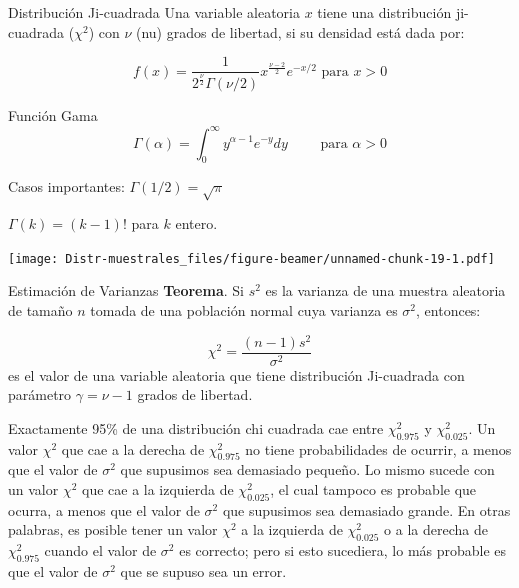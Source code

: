 \documentclass[
  10pt,
  ignorenonframetext,
]{beamer}
\begin{document}
\begin{frame}{}
\protect\hypertarget{section-46}{}
\begin{block}{Distribución Ji-cuadrada}
\protect\hypertarget{distribuciuxf3n-ji-cuadrada}{}
Una variable aleatoria \(x\) tiene una distribución ji-cuadrada
(\(\chi^2\)) con \(\nu\) (nu) grados de libertad, si su densidad está
dada por:

\[f(x)=\frac{1}{2^{\frac{\nu}{2}}\Gamma(\nu/2)}x^{\frac{\nu-2}{2}}e^{-x/2} \mbox{ para } x>0\]
\end{block}

\begin{block}{Función Gama}
\protect\hypertarget{funciuxf3n-gama}{}
\[\Gamma(\alpha)=\int_0^\infty y^{\alpha -1}e^{-y}dy \qquad \mbox{ para } \alpha >0\]

Casos importantes: \(\Gamma(1/2)=\sqrt{\pi}\)

\(\Gamma(k)= (k-1)!\) para \(k\) entero.
\end{block}
\end{frame}

\begin{frame}{}
\protect\hypertarget{section-47}{}
\texttt{[image: Distr-muestrales\_files/figure-beamer/unnamed-chunk-19-1.pdf]}
\end{frame}

\begin{frame}{}
\protect\hypertarget{section-48}{}
\begin{block}{Estimación de Varianzas}
\protect\hypertarget{estimaciuxf3n-de-varianzas}{}
\textbf{Teorema}. Si \(s^2\) es la varianza de una muestra aleatoria de
tamaño \(n\) tomada de una población normal cuya varianza es
\(\sigma^2\), entonces:

\[\chi^2=\frac{(n-1)s^2}{\sigma^2}\] es el valor de una variable
aleatoria que tiene distribución Ji-cuadrada con parámetro
\(\gamma = \nu - 1\) grados de libertad.

\bigskip

Exactamente 95\% de una distribución chi cuadrada cae entre
\(\chi_{0.975}^2\) y \(\chi_{0.025}^2\). Un valor \(\chi^2\) que cae a
la derecha de \(\chi_{0.975}^2\) no tiene probabilidades de ocurrir, a
menos que el valor de \(\sigma^2\) que supusimos sea demasiado pequeño.
Lo mismo sucede con un valor \(\chi^2\) que cae a la izquierda de
\(\chi_{0.025}^2\), el cual tampoco es probable que ocurra, a menos que
el valor de \(\sigma^2\) que supusimos sea demasiado grande. En otras
palabras, es posible tener un valor \(\chi^2\) a la izquierda de
\(\chi_{0.025}^2\) o a la derecha de \(\chi_{0.975}^2\) cuando el valor
de \(\sigma^2\) es correcto; pero si esto sucediera, lo más probable es
que el valor de \(\sigma^2\) que se supuso sea un error.
\end{block}
\end{frame}
\end{document}
